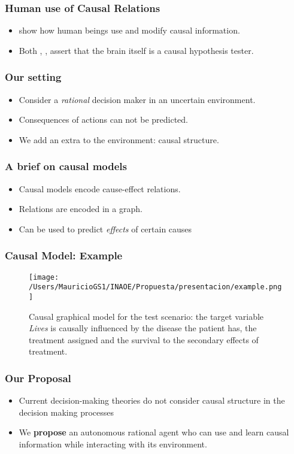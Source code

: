 \documentclass{beamer}
\theoremstyle{plain}
\begin{document}
\begin{frame}
\frametitle{Human use of Causal Relations}
\begin{itemize}
\item \cite{hagmayer2013repeated} show how human beings use and modify causal information.
\item Both \cite{hohwy2013predictive}, \cite{clark2015surfing}, assert that the brain itself is a causal hypothesis tester. 
\end{itemize}
\end{frame}

\begin{frame}
\frametitle{Our setting}
\begin{itemize}
\item Consider a \textit{rational} decision maker in an uncertain environment.
\item Consequences of actions can not be predicted.
\item We add an extra to the environment: causal structure. 
\end{itemize}
\end{frame}

\begin{frame}
\frametitle{A brief on causal models}
\begin{itemize}
\item Causal models encode cause-effect relations. 
\item Relations are encoded in a graph.
\item Can be used to predict \textit{effects} of certain causes
\end{itemize}
\end{frame}

\begin{frame}
\frametitle{Causal Model: Example}
\begin{figure}[ht]
\vskip 0.2in
\begin{center}
\texttt{[image: /Users/MauricioGS1/INAOE/Propuesta/presentacion/example.png]}
\caption{Causal graphical model for the test scenario: the target variable \textit{Lives} is causally influenced by the disease the patient has, the treatment assigned and the survival to the secondary effects of treatment.}
\label{causal_model}
\end{center}
\vskip -0.2in
\end{figure}
\end{frame}

\begin{frame}
\frametitle{Our Proposal}
\begin{itemize}
\item Current decision-making theories do not consider causal structure in the decision making processes
\item We \textbf{propose} an autonomous rational agent who can use and learn causal information while interacting with its environment.
\end{itemize}
\end{frame}
\end{document}
